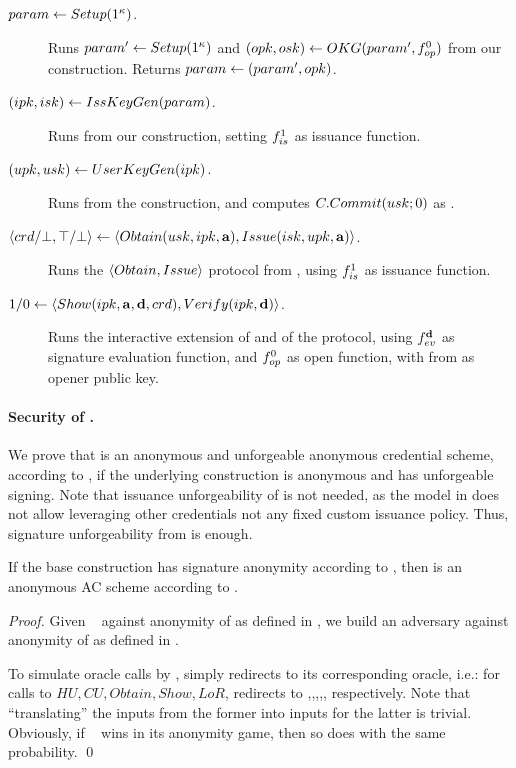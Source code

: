 \begin{description}
\item[$param \gets Setup(1^\kappa)$.] Runs $param' \gets Setup(1^\kappa)$
    and $(opk,osk) \gets OKG(param',f_{op}^0)$ from our \CUASGen
    construction. Returns $param \gets (param',opk)$.
\item[$(ipk,isk) \gets IssKeyGen(param)$.] Runs \IKeyGen from our
  \CUASGen construction, setting $f_{is}^1$ as issuance function.
\item[$(upk,usk) \gets UserKeyGen(ipk)$.] Runs \UKeyGen from the
  \CUASGen construction, and computes $C.Commit(usk;0)$ as \upk.
\item[$\langle crd/\bot,\top/\bot \rangle \gets
  \langle Obtain(usk,ipk,\mathbf{a}),Issue(isk,upk,\mathbf{a}) \rangle$.]
  Runs the $\langle Obtain,Issue \rangle$ protocol from \CUASGen, using
  $f_{is}^1$ as issuance function.
\item[$1/0 \gets \langle Show(ipk,\mathbf{a},\mathbf{d},crd),
  Verify(ipk,\mathbf{d}) \rangle$.]
  Runs the interactive extension of \Sign and \Verify of the \CUASGen protocol,
  using $f_{ev}^{\mathbf{d}}$ as signature evaluation function, and $f_{op}^0$ as
  open function, with \opk from \parm as opener public key.
\end{description}

\paragraph{Security of \CUASAC.} %
We prove that \CUASAC is an anonymous and unforgeable anonymous credential
scheme, according to \cite{fhs19}, if the underlying \CUASGen construction
is anonymous and has unforgeable signing. Note that issuance unforgeability
of \CUASGen is not needed, as the model in \cite{fhs19} does not allow
leveraging other credentials not any fixed custom issuance policy. Thus,
signature unforgeability from \UAS is enough.

\begin{theorem}
  \label{thm:anon-cuasac}
  If the base \CUASGen construction has signature anonymity according to
  , then \CUASAC is an anonymous AC scheme
  according to \cite{fhs19}.
\end{theorem}

\begin{proof}
  Given \adv~ against anonymity of \CUASAC as defined in \cite{fhs19}, we build
  an adversary \advB against anonymity of \CUASGen as defined in
  .

  To simulate oracle calls by \adv, \advB simply redirects to its corresponding
  oracle, i.e.: for calls to $HU,CU,Obtain,Show,LoR$, \advB redirects to
  \HUGEN,\CUGEN,\OBTAIN,\SIGN,\CHALb, respectively. Note that ``translating''
  the inputs from the former into inputs for the latter is trivial.
  Obviously, if \adv~ wins in its anonymity game, then so does \advB with the
  same probability.
  \qed
\end{proof}

